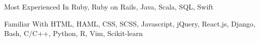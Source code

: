 


\begin{cvskills}


  \cvskill
  {Most Experienced In}
  {Ruby, Ruby on Rails, Java, Scala, SQL, Swift}


  \cvskill
  {Familiar With}
  {HTML, HAML, CSS, SCSS, Javascript, jQuery, React.js, Django, Bash, C/C++, Python, R, Vim, Scikit-learn}




\end{cvskills}
